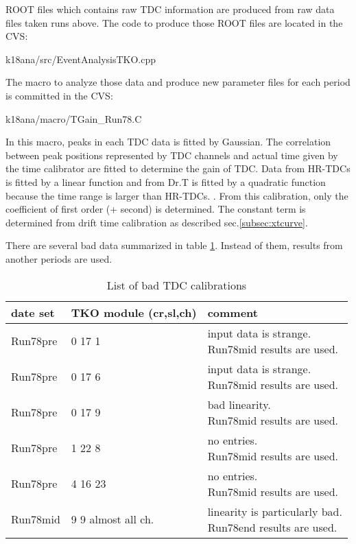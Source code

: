 ROOT files which contains raw TDC information are produced from raw data files taken runs above.
The code to produce those ROOT files are located in the CVS:
\begin{screen}
k18ana/src/EventAnalysisTKO.cpp 
\end{screen}
The macro to analyze those data and produce new parameter files for each period is committed in the CVS:
\begin{screen}
k18ana/macro/TGain\_Run78.C 
\end{screen}
In this macro, peaks in each TDC data is fitted by Gaussian. The correlation between peak positions represented by TDC channels and actual time given by the time calibrator are fitted to determine the gain of TDC. Data from HR-TDCs is fitted by a linear function and from Dr.T is fitted by a quadratic function because the time range is larger than HR-TDCs. .
From this calibration, only the coefficient of first order (+ second) is determined. The constant term is determined from drift time calibration as described sec.\ref{subsec:xtcurve}.


There are several bad data summarized in table \ref{tab:tdccalbad}. Instead of them, results from another periods are used.
\begin{table}[h]
\centering
\begin{tabular}{l|l|l}
date set & TKO module (cr,sl,ch)& comment\\\hline
Run78pre & 0 17 1  & \shortstack{input data is strange.\\ Run78mid results are used.} \\ \hline
Run78pre & 0 17 6  & \shortstack{input data is strange.\\ Run78mid results are used.} \\ \hline
Run78pre & 0 17 9  & \shortstack{bad linearity.\\ Run78mid results are used.} \\ \hline
Run78pre & 1 22 8  & \shortstack{no entries. \\Run78mid results are used.}\\ \hline
Run78pre & 4 16 23 & \shortstack{no entries. \\Run78mid results are used.}\\ \hline
Run78mid & 9  9 almost all ch. & \shortstack{linearity is particularly bad. \\Run78end results are used.} \\ \hline
\end{tabular}
\caption{\label{tab:tdccalbad} List of bad TDC calibrations}
\end{table}



